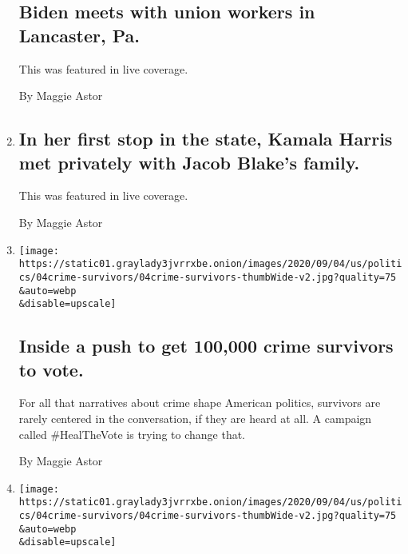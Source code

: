 \begin{enumerate}
  \hypertarget{biden-meets-with-union-workers-in-lancaster-pa}{%
  \subsection{Biden meets with union workers in Lancaster,
  Pa.}\label{biden-meets-with-union-workers-in-lancaster-pa}}

  This was featured in live coverage.

  By Maggie Astor
\item
  \href{/live/2020/09/07/us/trump-vs-biden/in-her-first-stop-in-the-state-kamala-harris-met-privately-with-jacob-blakes-family}{}

  \hypertarget{in-her-first-stop-in-the-state-kamala-harris-met-privately-with-jacob-blakes-family}{%
  \subsection{In her first stop in the state, Kamala Harris met
  privately with Jacob Blake's
  family.}\label{in-her-first-stop-in-the-state-kamala-harris-met-privately-with-jacob-blakes-family}}

  This was featured in live coverage.

  By Maggie Astor
\item
  \href{/2020/09/04/us/elections/inside-a-push-to-get-100000-crime-survivors-to-vote.html}{}

  \texttt{[image: https://static01.graylady3jvrrxbe.onion/images/2020/09/04/us/politics/04crime-survivors/04crime-survivors-thumbWide-v2.jpg?quality=75\\\&auto=webp\\\&disable=upscale]}

  \hypertarget{inside-a-push-to-get-100000-crime-survivors-to-vote}{%
  \subsection{Inside a push to get 100,000 crime survivors to
  vote.}\label{inside-a-push-to-get-100000-crime-survivors-to-vote}}

  For all that narratives about crime shape American politics, survivors
  are rarely centered in the conversation, if they are heard at all. A
  campaign called \#HealTheVote is trying to change that.

  By Maggie Astor
\item
  \href{/2020/09/04/us/politics/voting-crime-survivors.html}{}

  \texttt{[image: https://static01.graylady3jvrrxbe.onion/images/2020/09/04/us/politics/04crime-survivors/04crime-survivors-thumbWide-v2.jpg?quality=75\\\&auto=webp\\\&disable=upscale]}


\end{enumerate}
